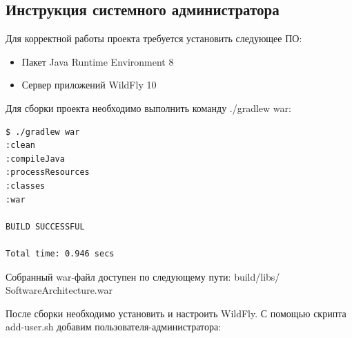 \subsection{Инструкция системного администратора}

Для корректной работы проекта требуется установить следующее ПО:

\begin{itemize}
\item Пакет Java Runtime Environment 8
\item Сервер приложений WildFly 10
\end{itemize}

Для сборки проекта необходимо выполнить команду ./gradlew war:

\begin{lstlisting}
$ ./gradlew war
:clean
:compileJava
:processResources
:classes
:war

BUILD SUCCESSFUL

Total time: 0.946 secs
\end{lstlisting}

Собранный war-файл доступен по следующему пути: build/libs/\\SoftwareArchitecture.war

После сборки необходимо установить и настроить WildFly. С помощью скрипта add-user.sh добавим пользователя-администратора:


